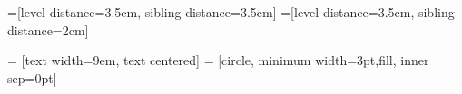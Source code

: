 \documentclass{article}
\begin{document}
=[level distance=3.5cm, sibling distance=3.5cm]
=[level distance=3.5cm, sibling distance=2cm]

 = [text width=9em, text centered]
 = [circle, minimum width=3pt,fill, inner sep=0pt]
\end{document}
